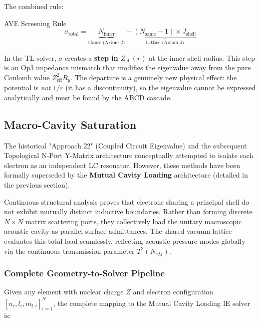 The combined rule:
\begin{resultbox}{AVE Screening Rule}
\begin{equation}
    \sigma_{\text{total}} = \underbrace{N_{\text{inner}}}_{\text{Gauss (Axiom 2)}}
    + \underbrace{(N_{\text{same}} - 1) \times J_{\text{shell}}}_{\text{Lattice (Axiom 4)}}
    \label{eq:screening_rule}
\end{equation}
\end{resultbox}

In the TL solver, $\sigma$ creates a \textbf{step in $Z_{\text{eff}}(r)$} at the inner
shell radius.  This step is an Op3 impedance mismatch that modifies the eigenvalue
away from the pure Coulomb value $Z_{\text{eff}}^2 R_y$.
The departure is a genuinely new physical effect: the potential is \emph{not} $1/r$
(it has a discontinuity), so the eigenvalue cannot be expressed analytically
and must be found by the ABCD cascade.

\subsection{Macro-Cavity Saturation}
\label{sec:macro_cavity_saturation}

The historical "Approach 22" (Coupled Circuit Eigenvalue) and the subsequent Topological N-Port Y-Matrix architecture conceptually attempted to isolate each electron as an independent LC resonator. However, these methods have been formally superseded by the \textbf{Mutual Cavity Loading} architecture (detailed in the previous section). 

Continuous structural analysis proves that electrons sharing a principal shell do not exhibit mutually distinct inductive boundaries. Rather than forming discrete $N \times N$ matrix scattering ports, they collectively load the unitary macroscopic acoustic cavity as parallel surface admittances. The shared vacuum lattice evaluates this total load seamlessly, reflecting acoustic pressure modes globally via the continuous transmission parameter $T^2(N_{eff})$.

\subsubsection{Complete Geometry-to-Solver Pipeline}
\label{sec:geometry_pipeline}

Given any element with nuclear charge $Z$ and electron
configuration $[n_i, l_i, m_{l,i}]_{i=1}^{N}$, the complete
mapping to the Mutual Cavity Loading IE solver is:

